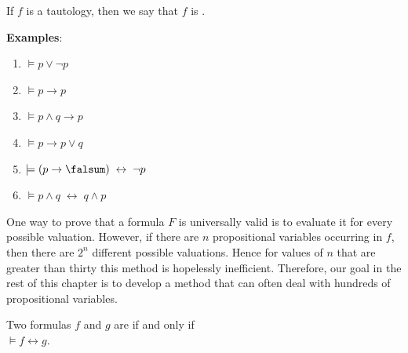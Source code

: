 \noindent
If $f$ is a tautology, then we say that $f$ is  .

\noindent
\textbf{Examples}:
\begin{enumerate}
\item $\models p \vee \neg p$
\item $\models p \rightarrow p$
\item $\models p \wedge q \rightarrow p$
\item $\models p \rightarrow p \vee q$
\item $\models (p \rightarrow \falsum) \;\leftrightarrow\; \neg p$
\item $\models p \wedge q \;\leftrightarrow\; q \wedge p$
\end{enumerate}
One way to prove that a formula $F$ is universally valid is to evaluate it for every possible valuation.
However, if there are $n$ propositional variables occurring in $f$, then there are $2^n$ different possible
valuations. 
Hence for values of $n$ that are greater than thirty this method is hopelessly inefficient.  Therefore, our
goal in the rest of this chapter is to develop 
a method that can often deal with hundreds of propositional variables.

\begin{Definition}[Equivalent]
  Two formulas $f$ and $g$ are   if and only if  \\[0.2cm]
  \hspace*{1.3cm} $\models f \leftrightarrow g$.   
  \eox
\end{Definition}

